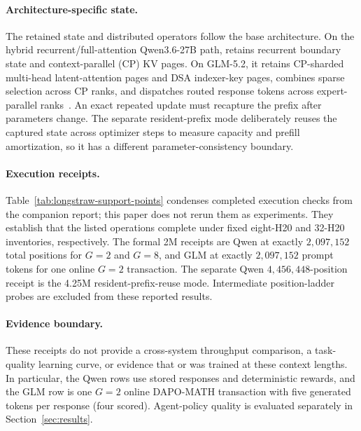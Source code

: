 \paragraph{Architecture-specific state.}
The retained state and distributed operators follow the base architecture. On
the hybrid recurrent/full-attention Qwen3.6-27B path, \longstraw{} retains
recurrent boundary state and context-parallel (CP) KV pages. On GLM-5.2, it
retains CP-sharded multi-head latent-attention pages and DSA indexer-key pages,
combines sparse selection across CP ranks, and dispatches routed response tokens
across expert-parallel ranks~\citep{qwen36_2026,qwen3_2025,glm52_2026,glm5_2026}.
An exact repeated update must recapture the prefix after parameters change. The
separate resident-prefix mode deliberately reuses the captured state across
optimizer steps to measure capacity and prefill amortization, so it has a
different parameter-consistency boundary.

\paragraph{Execution receipts.}
Table~\ref{tab:longstraw-support-points} condenses completed execution checks
from the \longstraw{} companion report; this paper does not rerun them as
\macaron{} experiments. They establish that the listed operations complete
under fixed eight-H20 and 32-H20 inventories, respectively. The formal 2M
receipts are Qwen at exactly $2{,}097{,}152$ total positions for $G=2$ and
$G=8$, and GLM at exactly $2{,}097{,}152$ prompt tokens for one online $G=2$
transaction. The separate Qwen $4{,}456{,}448$-position receipt is the 4.25M
resident-prefix-reuse mode. Intermediate position-ladder probes are excluded
from these reported results.

\paragraph{Evidence boundary.}
These receipts do not provide a cross-system throughput comparison, a
task-quality learning curve, or evidence that \venti{} or \tall{} was trained at
these context lengths. In particular, the Qwen rows use stored responses and
deterministic rewards, and the GLM row is one $G=2$ online DAPO-MATH transaction
with five generated tokens per response (four scored). Agent-policy quality is
evaluated separately in Section~\ref{sec:results}.


\FloatBarrier


